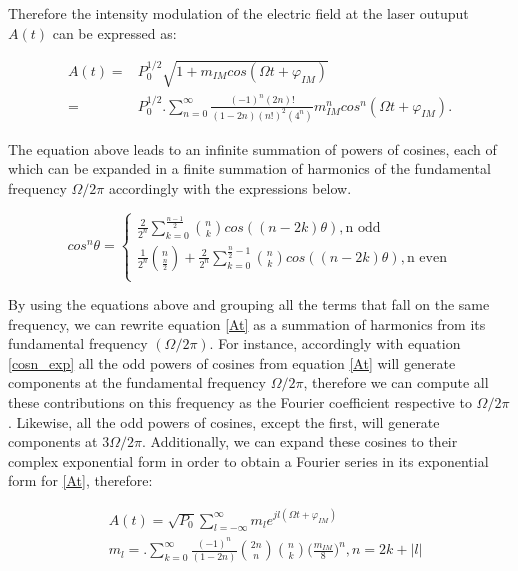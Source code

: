 \documentclass[twocolumn]{el-author}
\begin{document}
Therefore the intensity modulation of the electric field at the laser outuput $A(t)$ can be expressed as:

\begin{align} \nonumber \label{At}
A(t) = &P_0^{1/2}\sqrt{1 + m_{IM}cos(\Omega t + \varphi_{IM})} \\
= &P_0^{1/2}\bigg.\sum_{n = 0}^{\infty}\frac{(-1)^n(2n)!}{(1 - 2n)(n!)^2(4^n)}m_{IM}^ncos^n(\Omega t + \varphi_{IM})\bigg.
\end{align}

The equation above leads to an infinite summation of powers of cosines, each of which can be expanded in a finite summation of harmonics of the fundamental frequency $\Omega/2\pi$ accordingly with the expressions below.

\begin{equation} \label{cosn_exp}
cos^n\theta = 
\begin{cases} 
\displaystyle\frac{2}{2^n}\sum_{k = 0}^{\frac{n-1}{2}}\binom{n}{k}cos((n - 2k)\theta), \text{n odd}\ \\ 
\displaystyle\frac{1}{2^n}\binom{n}{\frac{n}{2}} + \frac{2}{2^n}\sum_{k = 0}^{\frac{n}{2}-1}\binom{n}{k}cos((n - 2k)\theta), \text{n even} \\ 
\end{cases}
\end{equation}

By using the equations above and grouping all the terms that fall on the same frequency, we can rewrite equation \eqref{At} as a summation of harmonics from its fundamental frequency $(\Omega/2\pi)$. For instance, accordingly with equation \eqref{cosn_exp} all the odd powers of cosines from equation \eqref{At} will generate components at the fundamental frequency $\Omega/2\pi$, therefore we can compute all these contributions on this frequency as the Fourier coefficient respective to $\Omega/2\pi$. Likewise, all the odd powers of cosines, except the first, will generate components at $3\Omega/2\pi$. Additionally, we can expand these cosines to their complex exponential form in order to obtain a Fourier series in its exponential form for \eqref{At}, therefore:

\begin{align}
& A(t) = \sqrt{P_0}\sum_{l = -\infty}^{\infty} m_le^{jl(\Omega t + \varphi_{IM})} \\
& m_l = \bigg.\sum_{k = 0}^{\infty}\frac{(-1)^n}{(1 - 2n)}\binom{2n}{n}\binom{n}{k}\bigg(\frac{m_{IM}}{8}\bigg)^n, n = 2k + |l|
\end{align}
\end{document}
